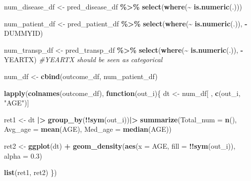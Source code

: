 \documentclass[
]{article}
\newenvironment{Shaded}{\begin{snugshade}}{\end{snugshade}}
\newcommand{\AttributeTok}[1]{\textcolor[rgb]{0.13,0.29,0.53}{#1}}
\newcommand{\CommentTok}[1]{\textcolor[rgb]{0.56,0.35,0.01}{\textit{#1}}}
\newcommand{\ControlFlowTok}[1]{\textcolor[rgb]{0.13,0.29,0.53}{\textbf{#1}}}
\newcommand{\FloatTok}[1]{\textcolor[rgb]{0.00,0.00,0.81}{#1}}
\newcommand{\FunctionTok}[1]{\textcolor[rgb]{0.13,0.29,0.53}{\textbf{#1}}}
\newcommand{\NormalTok}[1]{#1}
\newcommand{\OtherTok}[1]{\textcolor[rgb]{0.56,0.35,0.01}{#1}}
\newcommand{\SpecialCharTok}[1]{\textcolor[rgb]{0.81,0.36,0.00}{\textbf{#1}}}
\newcommand{\StringTok}[1]{\textcolor[rgb]{0.31,0.60,0.02}{#1}}
\begin{document}
\begin{Shaded}
\begin{Highlighting}[]
\NormalTok{num\_disease\_df }\OtherTok{\textless{}{-}}\NormalTok{ pred\_disease\_df }\SpecialCharTok{\%\textgreater{}\%}
  \FunctionTok{select}\NormalTok{(}\FunctionTok{where}\NormalTok{(}\SpecialCharTok{\textasciitilde{}} \FunctionTok{is.numeric}\NormalTok{(.)))}
  
\NormalTok{num\_patient\_df }\OtherTok{\textless{}{-}}\NormalTok{ pred\_patient\_df }\SpecialCharTok{\%\textgreater{}\%}
  \FunctionTok{select}\NormalTok{(}\FunctionTok{where}\NormalTok{(}\SpecialCharTok{\textasciitilde{}} \FunctionTok{is.numeric}\NormalTok{(.)), }
         \SpecialCharTok{{-}}\NormalTok{DUMMYID)}

\NormalTok{num\_transp\_df }\OtherTok{\textless{}{-}}\NormalTok{ pred\_transp\_df }\SpecialCharTok{\%\textgreater{}\%}
  \FunctionTok{select}\NormalTok{(}\FunctionTok{where}\NormalTok{(}\SpecialCharTok{\textasciitilde{}} \FunctionTok{is.numeric}\NormalTok{(.)), }
         \SpecialCharTok{{-}}\NormalTok{YEARTX) }\CommentTok{\#YEARTX should be seen as categorical}


\NormalTok{num\_df }\OtherTok{\textless{}{-}} \FunctionTok{cbind}\NormalTok{(outcome\_df, }
\NormalTok{                num\_patient\_df)}


\FunctionTok{lapply}\NormalTok{(}\FunctionTok{colnames}\NormalTok{(outcome\_df), }\ControlFlowTok{function}\NormalTok{(out\_i)\{}
\NormalTok{  dt }\OtherTok{\textless{}{-}}\NormalTok{ num\_df[ , }\FunctionTok{c}\NormalTok{(out\_i, }\StringTok{"AGE"}\NormalTok{)]}

\NormalTok{  ret1 }\OtherTok{\textless{}{-}}\NormalTok{ dt }\SpecialCharTok{|\textgreater{}}
    \FunctionTok{group\_by}\NormalTok{(}\SpecialCharTok{!!}\FunctionTok{sym}\NormalTok{(out\_i))}\SpecialCharTok{|\textgreater{}}
    \FunctionTok{summarize}\NormalTok{(}\AttributeTok{Total\_num =} \FunctionTok{n}\NormalTok{(),}
              \AttributeTok{Avg\_age =} \FunctionTok{mean}\NormalTok{(AGE), }
              \AttributeTok{Med\_age =} \FunctionTok{median}\NormalTok{(AGE))}

  
\NormalTok{  ret2 }\OtherTok{\textless{}{-}} \FunctionTok{ggplot}\NormalTok{(dt) }\SpecialCharTok{+} 
    \FunctionTok{geom\_density}\NormalTok{(}\FunctionTok{aes}\NormalTok{(}\AttributeTok{x =}\NormalTok{ AGE, }\AttributeTok{fill =} \SpecialCharTok{!!}\FunctionTok{sym}\NormalTok{(out\_i)), }
                 \AttributeTok{alpha =} \FloatTok{0.3}\NormalTok{) }
  
  \FunctionTok{list}\NormalTok{(ret1, ret2)}
\NormalTok{\})}
\end{Highlighting}
\end{Shaded}
\end{document}

